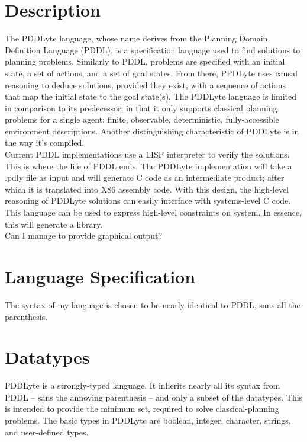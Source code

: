 \documentclass[
a4paper, %
11pt, %
onecolumn, %
openany, %
]{memoir}
\begin{document}

\section*{Description}
The PDDLyte language, whose name derives from the Planning Domain Definition Language (PDDL)\cite{pddl98}, is a specification language used to find solutions to planning problems. Similarly to PDDL, problems are specified with an initial state, a set of actions, and a set of goal states. From there, PPDLyte uses causal reasoning to deduce solutions, provided they exist, with a sequence of actions that map the initial state to the goal state(s). The PDDLyte language is limited in comparison to its predecessor, in that it only supports classical planning problems for a single agent: finite, observable, deterministic, fully-accessible  environment descriptions. Another distinguishing characteristic of PDDLyte is in the way it's compiled.\\

Current PDDL implementations use a LISP interpreter to verify the solutions. This is where the life of PDDL ends. The PDDLyte implementation will take a .pdly file as input and will generate C code as an intermediate product; after which it is translated into X86 assembly code. With this design, the high-level reasoning of PDDLyte solutions can easily interface with systems-level C code. This language can be used to express high-level constraints on system. In essence, this will generate a library.\\

Can I manage to provide graphical output?

\section*{Language Specification}
The syntax of my language is chosen to be nearly identical to PDDL, sans all the parenthesis.

\section*{Datatypes}
PDDLyte is a strongly-typed language. It inherits nearly all its syntax from PDDL -- sans the annoying parenthesis -- and only a subset of the datatypes. This is intended to provide the minimum set, required to solve classical-planning problems. The basic types in PDDLyte are boolean, integer, character, strings, and user-defined types.
\end{document}
